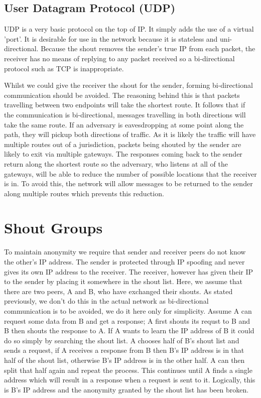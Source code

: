 \documentclass[ %
                    author={Luke Murray},
                supervisor={Dr. Simon Hollis},
                     title={Shadow Peer-to-Peer Networks},
                  subtitle={},
                    degree={MEng},
                      year={2013} ]{thesis}
\begin{document}
\subsection{User Datagram Protocol (UDP)}

UDP is a very basic protocol on the top of IP. It simply adds the use of a virtual 'port'. It is desirable for use in the network because it is stateless and uni-directional. Because the shout removes the sender's true IP from each packet, the receiver has no means of replying to any packet received so a bi-directional protocol such as TCP is inappropriate.

Whilst we could give the receiver the shout for the sender, forming bi-directional communication should be avoided. The reasoning behind this is that packets travelling between two endpoints will take the shortest route. It follows that if the communication is bi-directional, messages travelling in both directions will take the same route. If an adversary is eavesdropping at some point along the path, they will pickup both directions of traffic. As it is likely the traffic will have multiple routes out of a jurisdiction, packets being shouted by the sender are likely to exit via multiple gateways. The responses coming back to the sender return along the shortest route so the adversary, who listens at all of the gateways, will be able to reduce the number of possible locations that the receiver is in. To avoid this, the network will allow messages to be returned to the sender along multiple routes which prevents this reduction.

\section{Shout Groups}

To maintain anonymity we require that sender and receiver peers do not know the other's IP address. The sender is protected through IP spoofing and never gives its own IP address to the receiver. The receiver, however has given their IP to the sender by placing it somewhere in the shout list. Here, we assume that there are two peers, A and B, who have exchanged their shouts. As stated previously, we don't do this in the actual network as bi-directional communication is to be avoided, we do it here only for simplicity. Assume A can request some data from B and get a response; A first shouts its requst to B and B then shouts the response to A. If A wants to learn the IP address of B it could do so simply by searching the shout list. A chooses half of B's shout list and sends a request, if A receives a response from B then B's IP address is in that half of the shout list, otherwise B's IP address is in the other half. A can then split that half again and repeat the process. This continues until A finds a single address which will result in a response when a request is sent to it. Logically, this is B's IP address and the anonymity granted by the shout list has been broken.
\end{document}
